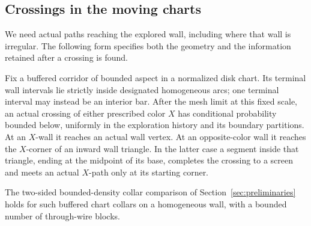 \subsection{Crossings in the moving charts}
\label{peel:crossings}

We need actual paths reaching the explored wall, including where that
wall is irregular.  The following form specifies both the geometry and
the information retained after a crossing is found.

\begin{lemma}\label{peel:wall-rsw}
Fix a buffered corridor of bounded aspect in a normalized disk chart.
Its terminal wall intervals lie strictly inside designated homogeneous
arcs; one terminal interval may instead be an interior bar.  After the
mesh limit at this fixed scale, an actual crossing of either prescribed
color $X$ has conditional probability bounded below, uniformly in the
exploration history and its boundary partitions.  At an $X$-wall it
reaches an actual wall vertex.  At an opposite-color wall it reaches
the $X$-corner of an inward wall triangle.  In the latter case a segment
inside that triangle, ending at the midpoint of its base, completes
the crossing to a screen and meets an actual $X$-path only at its
starting corner.

The two-sided bounded-density collar comparison of
Section~\ref{sec:preliminaries} holds for such buffered chart collars
on a homogeneous wall, with a bounded number of through-wire blocks.
\end{lemma}

